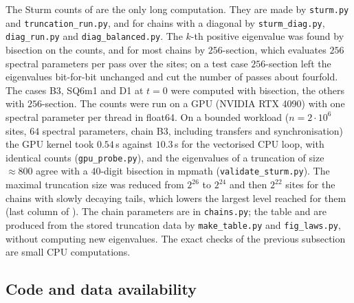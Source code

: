 The Sturm counts of  are the only long computation. They are made by
\texttt{sturm.py} and \texttt{truncation\_run.py}, and for chains with a diagonal by
\texttt{sturm\_diag.py}, \texttt{diag\_run.py} and \texttt{diag\_balanced.py}. The $k$-th positive eigenvalue was found by bisection on the counts, and
for most chains by $256$-section, which evaluates $256$ spectral parameters per pass over the sites;
on a test case $256$-section left the eigenvalues bit-for-bit unchanged and cut the number of passes
about fourfold. The cases B3, SQ6m1 and D1 at $t=0$ were computed with bisection, the others with
$256$-section. The counts were run on a GPU (NVIDIA RTX 4090) with one spectral parameter per thread in
float64. On a bounded workload ($n=2\cdot10^6$ sites, $64$ spectral parameters, chain B3, including
transfers and synchronisation) the GPU kernel took $0.54$\,s against $10.3$\,s for the vectorised CPU
loop, with identical counts (\texttt{gpu\_probe.py}), and the eigenvalues of a truncation of size $\approx800$ agree with a $40$-digit bisection in
mpmath (\texttt{validate\_sturm.py}). The maximal truncation size was reduced from $2^{26}$ to $2^{24}$ and
then $2^{22}$ sites for the chains with slowly decaying tails, which lowers the largest level reached for
them (last column of ). The chain parameters are in \texttt{chains.py}; the table and
 are produced from the stored truncation data by \texttt{make\_table.py} and
\texttt{fig\_laws.py}, without computing new eigenvalues. The exact checks of the previous subsection are
small CPU computations.

\subsection{Code and data availability}\label{app:availability}


